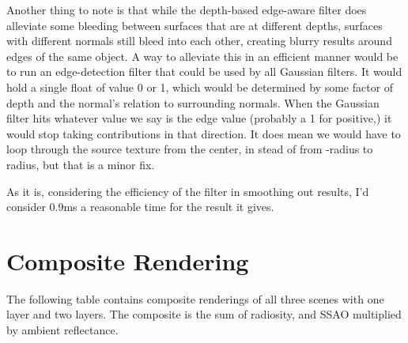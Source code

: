 Another thing to note is that while the depth-based edge-aware filter does alleviate some bleeding between surfaces that are at different depths, surfaces with different normals still bleed into each other, creating blurry results around edges of the same object. A way to alleviate this in an efficient manner would be to run an edge-detection filter that could be used by all Gaussian filters. It would hold a single float of value 0 or 1, which would be determined by some factor of depth and the normal's relation to surrounding normals. When the Gaussian filter hits whatever value we say is the edge value (probably a 1 for positive,) it would stop taking contributions in that direction. It does mean we would have to loop through the source texture from the center, in stead of from -radius to radius, but that is a minor fix.

As it is, considering the efficiency of the filter in smoothing out results, I'd consider 0.9ms a reasonable time for the result it gives.

\section{Composite Rendering}
The following table contains composite renderings of all three scenes with one layer and two layers. The composite is the sum of radiosity, and SSAO multiplied by ambient reflectance.

